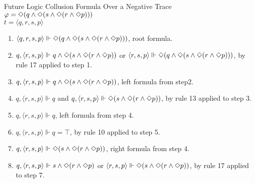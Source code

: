 \begin{myEx} Future Logic Collusion Formula Over a Negative Trace\\

\noindent
$\varphi = \Diamond(q \land \Diamond(s \land \Diamond(r \land \Diamond p)))$\\
$t = \langle q, r, s, p \rangle$

\begin{enumerate}
\item $\langle q,r,s,p \rangle \Vdash \Diamond(q \land \Diamond(s \land \Diamond(r \land \Diamond p)))$, root formula.\\ %

\item $q, \langle r,s,p \rangle \Vdash q \land \Diamond(s \land \Diamond(r \land \Diamond p))$ or $\langle r,s,p \rangle \Vdash \Diamond(q \land \Diamond(s \land \Diamond(r \land \Diamond p)))$, by rule 17 applied to step 1.\\ %

\item $q, \langle r,s,p \rangle \Vdash q \land \Diamond(s \land \Diamond(r \land \Diamond p))$, left formula from step2.\\ %

\item $q, \langle r,s,p \rangle \Vdash q$ and $q, \langle r,s,p \rangle \Vdash \Diamond(s \land \Diamond(r \land \Diamond p))$, by rule 13 applied to step 3.\\ %

\item $q, \langle r,s,p \rangle \Vdash q$, left formula from step 4.\\ %

\item $q, \langle r,s,p \rangle \Vdash q = \top$, by rule 10 applied to step 5.\\ %

\item $q, \langle r,s,p \rangle \Vdash \Diamond(s \land \Diamond(r \land \Diamond p))$, right formula from step 4.\\ %

\item $q, \langle r,s,p \rangle \Vdash s \land \Diamond(r \land \Diamond p)$ or $\langle r,s,p \rangle \Vdash \Diamond(s \land \Diamond(r \land \Diamond p))$, by rule 17 applied to step 7.\\ %


\end{enumerate}
\end{myEx}
